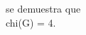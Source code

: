 \documentclass[preview]{standalone}
\begin{document}
\begin{center}
se demuestra que \\chi(G) = 4.
\end{center}
\end{document}
